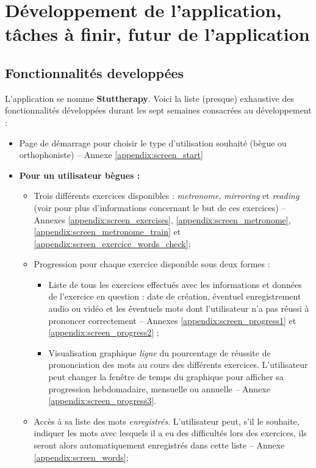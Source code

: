 \section{Développement de l'application, tâches à finir, futur de l'application}

\subsection{Fonctionnalités developpées}
L'application se nomme \textbf{Stuttherapy}. Voici la liste (presque) exhaustive des fonctionnalités développées durant les sept semaines consacrées au développement :

\begin{itemize}
  \item Page de démarrage pour choisir le type d'utilisation souhaité (bègue ou orthophoniste) -- Annexe \ref{appendix:screen_start}
  \item \textbf{Pour un utilisateur bègues :}
  \begin{itemize}
    \item Trois différents exercices disponibles : \textit{metronome}, \textit{mirroring} et \textit{reading} (voir  pour plus d'informations concernant le but de ces exercices) -- Annexes \ref{appendix:screen_exercises}, \ref{appendix:screen_metronome}, \ref{appendix:screen_metronome_train} et \ref{appendix:screen_exercice_words_check};
    \item Progression pour chaque exercice disponible sous deux formes :
    \begin{itemize}
      \item Liste de tous les exercices effectués avec les informations et données de l'exercice en question : date de création, éventuel enregistrement audio ou vidéo et les éventuels mots dont l'utilisateur n'a pas réussi à prononcer correctement -- Annexes \ref{appendix:screen_progress1} et \ref{appendix:screen_progress2} ;
      \item Visualisation graphique \textit{ligne} du pourcentage de réussite de prononciation des mots au cours des différents exercices. L'utilisateur peut changer la fenêtre de temps du graphique pour afficher sa progression hebdomadaire, mensuelle ou annuelle -- Annexe \ref{appendix:screen_progress3}.
    \end{itemize}
    \item Accès à sa liste des mots \textit{enregistrés}. L'utilisateur peut, s'il le souhaite, indiquer les mots avec lesquels il a eu des difficultés lors des exercices, ils seront alors automatiquement enregistrés dans cette liste -- Annexe \ref{appendix:screen_words};

\end{itemize}
\end{itemize}
